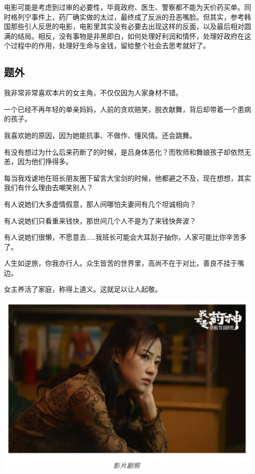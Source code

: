 \documentclass[]{book}
\begin{document}
电影可能是考虑到过审的必要性，毕竟政府、医生、警察都不能为天价药买单。同时格列宁事件上，药厂确实做的太过，最终成了反派的丑恶嘴脸。但其实，参考韩国那些引人反思的电影，电影里其实没有必要去出现这样的反面，以及最后相对圆满的结局。相反，没有事物是非黑即白，如何处理好利润和情怀，处理好政府在这个过程中的作用，处理好生命与金钱，留给整个社会去思考就好了。

\hypertarget{ux9898ux5916}{%
\subsection{题外}\label{ux9898ux5916}}

我非常非常喜欢本片的女主角，不仅仅因为人家身材不错。

一个已经不再年轻的单亲妈妈，人前的贪欢赔笑，脱衣献舞，背后却带着一个患病的孩子。

我喜欢她的原因，因为她能抗事、不做作、懂风情。还会跳舞。

有没有想过为什么后来药断了的时候，是吕身体恶化？而牧师和舞娘孩子却依然无恙，因为他们挣得多。

每当我戏谑地在班长朋友圈下留言大宝剑的时候，他都避之不及，现在想想，其实我们有什么理由去嘲笑别人？

有人说她们大多虚情假意，那人间哪怕夫妻间有几个坦诚相向？

有人说她们只看重来钱快，那世间几个人不是为了来钱快奔波？

有人说她们很懒，不愿意去\ldots{}\ldots{}我班长可能会大耳刮子抽你，人家可能比你辛苦多了。

人生如逆旅，你我亦行人。众生皆苦的世界里，高尚不在于对比，善良不挂于嘴边。

女主养活了家庭，称得上道义。这就足以让人起敬。

\includegraphics[width=6.67in]{images/yaoshen3}
\end{document}
